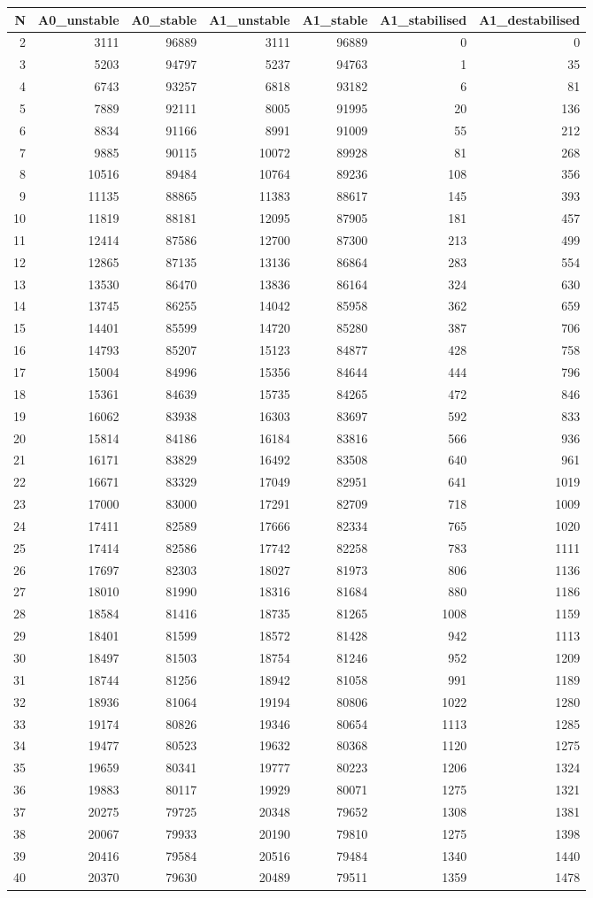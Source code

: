 \documentclass[]{article}
\begin{document}
\begin{longtable}[]{@{}rrrrrrr@{}}
\toprule
N & A0\_unstable & A0\_stable & A1\_unstable & A1\_stable &
A1\_stabilised & A1\_destabilised\tabularnewline
\midrule
\endhead
2 & 3111 & 96889 & 3111 & 96889 & 0 & 0\tabularnewline
3 & 5203 & 94797 & 5237 & 94763 & 1 & 35\tabularnewline
4 & 6743 & 93257 & 6818 & 93182 & 6 & 81\tabularnewline
5 & 7889 & 92111 & 8005 & 91995 & 20 & 136\tabularnewline
6 & 8834 & 91166 & 8991 & 91009 & 55 & 212\tabularnewline
7 & 9885 & 90115 & 10072 & 89928 & 81 & 268\tabularnewline
8 & 10516 & 89484 & 10764 & 89236 & 108 & 356\tabularnewline
9 & 11135 & 88865 & 11383 & 88617 & 145 & 393\tabularnewline
10 & 11819 & 88181 & 12095 & 87905 & 181 & 457\tabularnewline
11 & 12414 & 87586 & 12700 & 87300 & 213 & 499\tabularnewline
12 & 12865 & 87135 & 13136 & 86864 & 283 & 554\tabularnewline
13 & 13530 & 86470 & 13836 & 86164 & 324 & 630\tabularnewline
14 & 13745 & 86255 & 14042 & 85958 & 362 & 659\tabularnewline
15 & 14401 & 85599 & 14720 & 85280 & 387 & 706\tabularnewline
16 & 14793 & 85207 & 15123 & 84877 & 428 & 758\tabularnewline
17 & 15004 & 84996 & 15356 & 84644 & 444 & 796\tabularnewline
18 & 15361 & 84639 & 15735 & 84265 & 472 & 846\tabularnewline
19 & 16062 & 83938 & 16303 & 83697 & 592 & 833\tabularnewline
20 & 15814 & 84186 & 16184 & 83816 & 566 & 936\tabularnewline
21 & 16171 & 83829 & 16492 & 83508 & 640 & 961\tabularnewline
22 & 16671 & 83329 & 17049 & 82951 & 641 & 1019\tabularnewline
23 & 17000 & 83000 & 17291 & 82709 & 718 & 1009\tabularnewline
24 & 17411 & 82589 & 17666 & 82334 & 765 & 1020\tabularnewline
25 & 17414 & 82586 & 17742 & 82258 & 783 & 1111\tabularnewline
26 & 17697 & 82303 & 18027 & 81973 & 806 & 1136\tabularnewline
27 & 18010 & 81990 & 18316 & 81684 & 880 & 1186\tabularnewline
28 & 18584 & 81416 & 18735 & 81265 & 1008 & 1159\tabularnewline
29 & 18401 & 81599 & 18572 & 81428 & 942 & 1113\tabularnewline
30 & 18497 & 81503 & 18754 & 81246 & 952 & 1209\tabularnewline
31 & 18744 & 81256 & 18942 & 81058 & 991 & 1189\tabularnewline
32 & 18936 & 81064 & 19194 & 80806 & 1022 & 1280\tabularnewline
33 & 19174 & 80826 & 19346 & 80654 & 1113 & 1285\tabularnewline
34 & 19477 & 80523 & 19632 & 80368 & 1120 & 1275\tabularnewline
35 & 19659 & 80341 & 19777 & 80223 & 1206 & 1324\tabularnewline
36 & 19883 & 80117 & 19929 & 80071 & 1275 & 1321\tabularnewline
37 & 20275 & 79725 & 20348 & 79652 & 1308 & 1381\tabularnewline
38 & 20067 & 79933 & 20190 & 79810 & 1275 & 1398\tabularnewline
39 & 20416 & 79584 & 20516 & 79484 & 1340 & 1440\tabularnewline
40 & 20370 & 79630 & 20489 & 79511 & 1359 & 1478\tabularnewline

\end{longtable}
\end{document}
